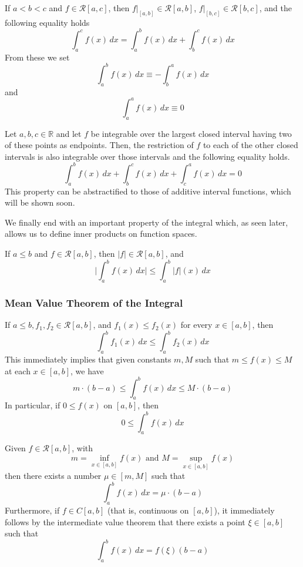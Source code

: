  \begin{lemma}
    If $a < b < c$ and $f \in \mathcal{R}[a, c]$, then $f \big|_{[a,b]} \in \mathcal{R}[a, b]$, $f \big|_{[b,c]} \in \mathcal{R}[b, c]$, and the following equality holds 
    \[\int_a^c f(x)\,dx = \int_a^b f(x)\, dx + \int_b^c f(x)\,dx\]
    From these we set
    \[\int_a^b f(x)\,dx \equiv - \int_b^a f(x)\,dx\]
    and 
    \[\int_a^a f(x)\,dx \equiv 0\]
  \end{lemma}

  \begin{theorem}
  Let $a, b, c \in \mathbb{R}$ and let $f$ be integrable over the largest closed interval having two of these points as endpoints. Then, the restriction of $f$ to each of the other closed intervals is also integrable over those intervals and the following equality holds. 
  \[\int_a^b f(x)\,dx + \int_b^c f(x)\,dx + \int_c^a f(x)\,dx = 0\]
  This property can be abstractified to those of additive interval functions, which will be shown soon. 
  \end{theorem}

  We finally end with an important property of the integral which, as seen later, allows us to define inner products on function spaces. 
  \begin{theorem}
  If $a \leq b$ and $f \in \mathcal{R}[a, b]$, then $|f| \in \mathcal{R}[a, b]$, and 
  \[\Bigg| \int_a^b f(x)\,dx \Bigg| \leq \int_a^b |f|(x)\,dx\]
  \end{theorem}

  \subsubsection{Mean Value Theorem of the Integral}

  \begin{lemma}
    If $a \leq b, f_1, f_2 \in \mathcal{R}[a, b]$, and $f_1 (x) \leq f_2 (x)$ for every $x \in [a, b]$, then
    \[\int_a^b f_1 (x)\,dx \leq \int_a^b f_2 (x)\,dx\]
    This immediately implies that given constants $m, M$ such that $m \leq f(x) \leq M$ at each $x \in [a, b]$, we have
    \[m \cdot (b - a) \leq \int_a^b f(x)\,dx \leq M \cdot (b-a)\]
    In particular, if $0 \leq f(x)$ on $[a, b]$, then
    \[0 \leq \int_a^b f(x)\,dx\]
  \end{lemma}

  \begin{theorem}
  Given $f \in \mathcal{R}[a, b]$, with 
  \[m = \inf_{x \in [a, b]} f(x) \text{ and } M = \sup_{x \in [a, b]} f(x)\]
  then there exists a number $\mu \in [m, M]$ such that
  \[\int_a^b f(x)\,dx = \mu \cdot (b - a)\]
  Furthermore, if $f \in C[a, b]$ (that is, continuous on $[a, b]$), it immediately follows by the intermediate value theorem that there exists a point $\xi \in [a, b]$ such that
  \[\int_a^b f(x)\,dx = f(\xi) (b - a)\]
  \end{theorem}

